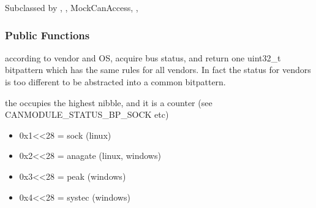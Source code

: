 \documentclass[a4paper,10pt,english]{sphinxmanual}
\begin{document}
\begin{fulllineitems}
\label{\detokenize{canports:_CPPv4N9CanModule10CCanAccessE}}%
\pysigstartmultiline
{}%
\pysigstopmultiline
Subclassed by {\hyperref[\detokenize{classestracing:classAnaCanScan}]{}}, {\hyperref[\detokenize{classestracing:classCSockCanScan}]{}}, MockCanAccess, {\hyperref[\detokenize{vendors/peak:classPKCanScan}]{}}, {\hyperref[\detokenize{classestracing:classSTCanScan}]{}}
\subsubsection*{Public Functions}

\begin{fulllineitems}
\label{\detokenize{canports:_CPPv4N9CanModule10CCanAccess13getPortStatusEv}}%
\pysigstartmultiline
{}%
\pysigstopmultiline
according to vendor and OS, acquire bus status, and return one uint32\_t bitpattern which has the same rules for all vendors. In fact the status for vendors is too different to be abstracted into a common bitpattern.

the  occupies the highest nibble, and it is a counter (see CANMODULE\_STATUS\_BP\_SOCK etc)\begin{itemize}
\item {} 
0x1\textless{}\textless{}28 = sock (linux)

\item {} 
0x2\textless{}\textless{}28 = anagate (linux, windows)

\item {} 
0x3\textless{}\textless{}28 = peak (windows)

\item {} 
0x4\textless{}\textless{}28 = systec (windows)


\end{itemize}
\end{fulllineitems}
\end{fulllineitems}
\end{document}
